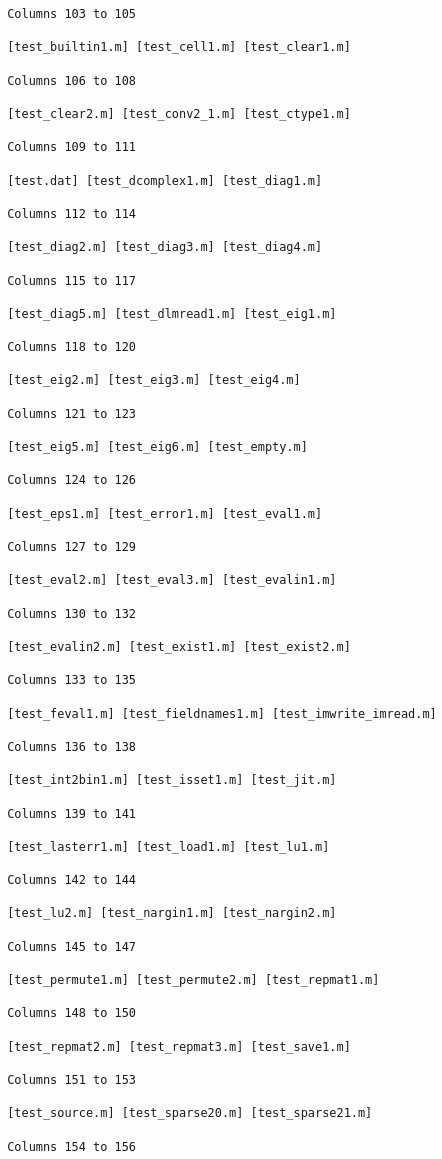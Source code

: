 \begin{verbatim}
 Columns 103 to 105

 [test_builtin1.m] [test_cell1.m] [test_clear1.m] 

 Columns 106 to 108

 [test_clear2.m] [test_conv2_1.m] [test_ctype1.m] 

 Columns 109 to 111

 [test.dat] [test_dcomplex1.m] [test_diag1.m] 

 Columns 112 to 114

 [test_diag2.m] [test_diag3.m] [test_diag4.m] 

 Columns 115 to 117

 [test_diag5.m] [test_dlmread1.m] [test_eig1.m] 

 Columns 118 to 120

 [test_eig2.m] [test_eig3.m] [test_eig4.m] 

 Columns 121 to 123

 [test_eig5.m] [test_eig6.m] [test_empty.m] 

 Columns 124 to 126

 [test_eps1.m] [test_error1.m] [test_eval1.m] 

 Columns 127 to 129

 [test_eval2.m] [test_eval3.m] [test_evalin1.m] 

 Columns 130 to 132

 [test_evalin2.m] [test_exist1.m] [test_exist2.m] 

 Columns 133 to 135

 [test_feval1.m] [test_fieldnames1.m] [test_imwrite_imread.m] 

 Columns 136 to 138

 [test_int2bin1.m] [test_isset1.m] [test_jit.m] 

 Columns 139 to 141

 [test_lasterr1.m] [test_load1.m] [test_lu1.m] 

 Columns 142 to 144

 [test_lu2.m] [test_nargin1.m] [test_nargin2.m] 

 Columns 145 to 147

 [test_permute1.m] [test_permute2.m] [test_repmat1.m] 

 Columns 148 to 150

 [test_repmat2.m] [test_repmat3.m] [test_save1.m] 

 Columns 151 to 153

 [test_source.m] [test_sparse20.m] [test_sparse21.m] 

 Columns 154 to 156


\end{verbatim}
